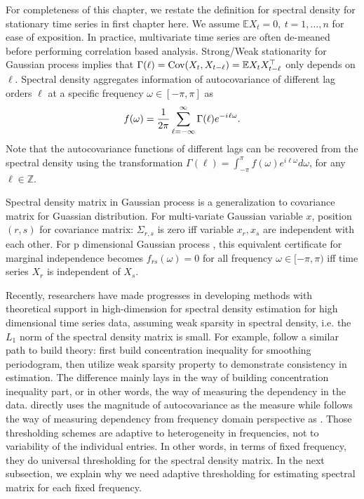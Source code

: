 For completeness of this chapter, we restate the definition for spectral density for stationary time series in first chapter here. We assume $\mathbb{E} X_t = 0, ~ t=1,\ldots,n$ for ease of exposition. In practice, multivariate time series are often de-meaned before performing correlation based analysis. Strong/Weak stationarity for Gaussian process implies that $\Gamma(\ell) = \mbox{Cov}(X_t, X_{t-\ell}) = \mathbb{E} X_t X_{t-\ell}^\top$ only depends on $\ell$. Spectral density aggregates information of autocovariance of different lag orders $\ell$  at a specific frequency $\omega \in [-\pi, \pi]$ as 
\begin{equation}
\label{eq:def_spectral_density}
f(\omega) = \frac{1}{2\pi}\sum_{\ell=-\infty}^\infty \Gamma(\ell) e^{-{i\mkern1mu} \ell \omega }. 
\end{equation}
Note that the autocovariance functions of different lags can be recovered from the spectral density using the transformation  $\Gamma(\ell) =  \int_{-\pi}^{\pi} f(\omega) e^{i\ell \omega} d\omega$, for any $\ell \in \mathbb{Z}$.\par 
Spectral density matrix in Gaussian process is a generalization to covariance matrix for Guassian distribution. For multi-variate Gaussian variable $x$,  position $(r,s)$ for covariance matrix: $\Sigma_{r, s}$ is zero iff variable $x_r, x_s$ are independent with each other. For p dimensional Gaussian process , this equivalent certificate for marginal independence becomes $f_{rs}(\omega) = 0$ for all frequency $\omega\in [-\pi, \pi)$ iff time series $X_r$ is independent of $X_s$. \par 
Recently, researchers have made progresses in developing methods with theoretical support in high-dimension for spectral density estimation for high dimensional time series data, assuming weak sparsity in spectral density, i.e. the $L_1$ norm of the spectral density matrix is small. For example, \cite{fiecas2018spectral, sun2018large} follow a similar path to build theory: first build concentration inequality for smoothing periodogram, then utilize weak sparsity property to demonstrate consistency in estimation. The difference mainly lays in the way of building concentration inequality part, or in other words, the way of measuring the dependency in the data. \cite{fiecas2018spectral} directly uses the magnitude of autocovariance as the measure while \cite{sun2018large} follows the way of measuring dependency from frequency domain perspective as \cite{Basu2015}. Those thresholding
schemes are adaptive to heterogeneity in frequencies, not to variability of the individual entries. In other words, in terms of fixed frequency, they do universal thresholding for the spectral density matrix. In the next subsection, we explain why we need adaptive thresholding for estimating spectral matrix for each fixed frequency. 

